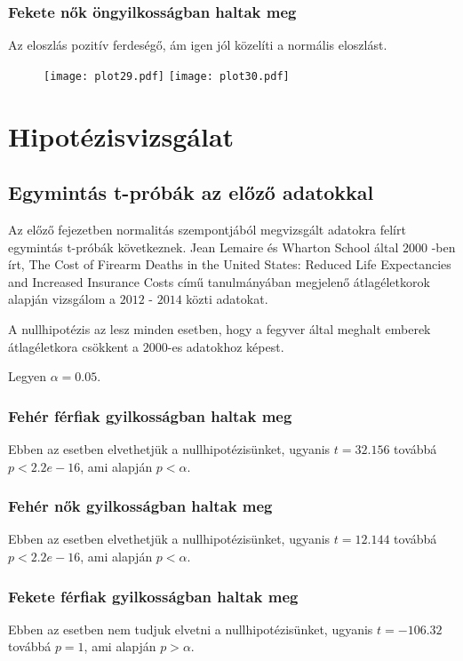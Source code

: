 \documentclass{article}
\begin{document}
\newpage

\subsubsection{Fekete nők öngyilkosságban haltak meg}

Az eloszlás pozitív ferdeségő, ám igen jól közelíti a normális eloszlást.

\begin{figure}[!htb]
\texttt{[image: plot29.pdf]}
\texttt{[image: plot30.pdf]}
\end{figure}

\section{Hipotézisvizsgálat}

\subsection{Egymintás t-próbák az előző adatokkal}

Az előző fejezetben normalitás szempontjából megvizsgált adatokra felírt egymintás t-próbák következnek. Jean Lemaire és Wharton School által $2000$ -ben írt, The Cost of Firearm Deaths in the United States: Reduced Life Expectancies and Increased Insurance Costs című tanulmányában megjelenő átlagéletkorok alapján vizsgálom a $2012$ - $2014$ közti adatokat. \par
A nullhipotézis az lesz minden esetben, hogy a fegyver által meghalt emberek átlagéletkora csökkent a $2000$-es adatokhoz képest. \par
Legyen  $\alpha = 0.05$.

\subsubsection{Fehér férfiak gyilkosságban haltak meg}
Ebben az esetben elvethetjük a nullhipotézisünket, ugyanis  $t = 32.156$ továbbá  $p < 2.2e-16$, ami alapján $p < \alpha$.

\subsubsection{Fehér nők gyilkosságban haltak meg}
Ebben az esetben elvethetjük a nullhipotézisünket, ugyanis  $t = 12.144$ továbbá  $p < 2.2e-16$, ami alapján $p < \alpha$.

\subsubsection{Fekete férfiak gyilkosságban haltak meg}
Ebben az esetben nem tudjuk elvetni a nullhipotézisünket, ugyanis  $t = -106.32$ továbbá  $p = 1$, ami alapján $p > \alpha$.
\end{document}

